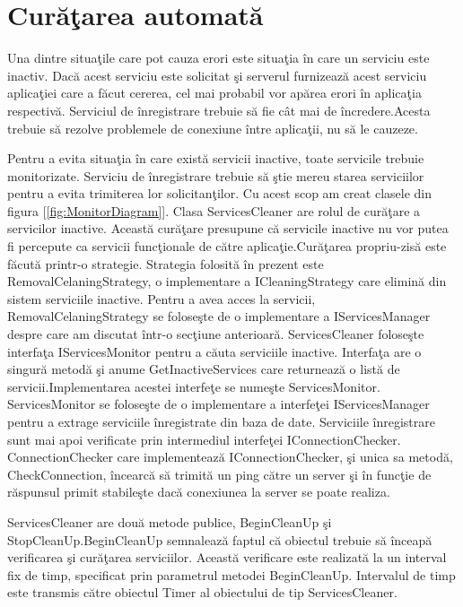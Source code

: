 \documentclass[a4paper,12pt]{report}
\let\oldref\ref
\renewcommand{\ref}[1]{[\oldref{#1}]}
\begin{document}
\section{Cur\u a\c tarea automat\u a}

Una dintre situa\c tile care pot cauza erori este situa\c tia \^in care un serviciu este inactiv.
Dac\u a acest serviciu este solicitat \c si serverul furnizeaz\u a acest serviciu aplica\c tiei 
care a f\u acut cererea, cel mai probabil vor ap\u area erori \^in aplica\c tia respectiv\u a.
Serviciul de \^inregistrare trebuie s\u a fie c\^at mai de \^incredere.Acesta trebuie s\u a rezolve problemele
de conexiune \^intre aplica\c tii, nu s\u a le cauzeze.

Pentru a evita situa\c tia \^in care exist\u a servicii inactive, toate servicile trebuie monitorizate.
Serviciu de \^inregistrare trebuie s\u a \c stie mereu starea serviciilor pentru a evita trimiterea lor solicitan\c tilor.
Cu acest scop am creat clasele din figura \ref{fig:MonitorDiagram}. Clasa ServicesCleaner are rolul de cur\u a\c tare a servicilor
inactive. Aceast\u a cur\u a\c tare presupune c\u a servicile inactive nu vor putea fi percepute ca servicii func\c tionale de 
c\u atre aplica\c tie.Cur\u a\c tarea propriu-zis\u a este f\u acut\u a printr-o strategie. Strategia folosit\u a \^in prezent este 
RemovalCelaningStrategy, o implementare a ICleaningStrategy care elimin\u a din sistem  serviciile inactive. Pentru a avea acces la servicii, 
RemovalCelaningStrategy se folose\c ste de o implementare a IServicesManager despre care am discutat \^intr-o sec\c tiune anterioar\u a.
 ServicesCleaner folose\c ste
interfa\c ta IServicesMonitor pentru a c\u auta serviciile inactive. Interfa\c ta are o singur\u a metod\u a \c si anume GetInactiveServices 
care returneaz\u a o list\u a de servicii.Implementarea acestei interfe\c te se nume\c ste ServicesMonitor. ServicesMonitor se folose\c ste 
de o implementare a interfe\c tei IServicesManager pentru a extrage serviciile \^inregistrate din baza de date. Serviciile \^inregistrare 
sunt mai apoi verificate prin intermediul interfe\c tei IConnectionChecker. ConnectionChecker care implementeaz\u a IConnectionChecker,
\c si unica sa metod\u a, CheckConnection, \^incearc\u a s\u a trimit\u a un ping c\u atre un server \c si \^in func\c tie de
r\u aspunsul primit stabile\c ste dac\u a conexiunea la server se poate realiza.

ServicesCleaner are dou\u a metode publice, BeginCleanUp \c si StopCleanUp.BeginCleanUp semnaleaz\u a faptul c\u a obiectul trebuie
s\u a \^inceap\u a verificarea \c si cur\u a\c tarea serviciilor. Aceast\u a verificare este realizat\u a la un interval fix de timp,
specificat prin parametrul metodei BeginCleanUp. Intervalul de timp este transmis c\u atre obiectul Timer al obiectului de tip 
ServicesCleaner.
\end{document}
